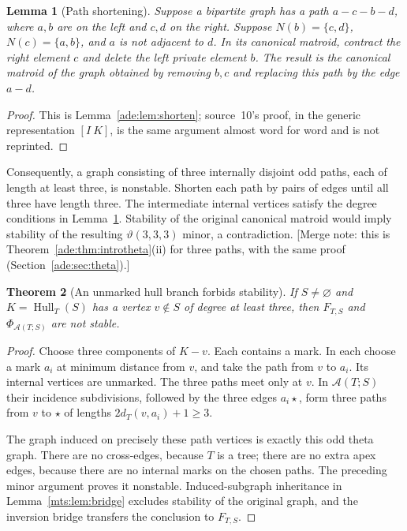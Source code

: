 \documentclass[11pt]{article}
\numberwithin{equation}{section}
\newtheorem{theorem}{Theorem}[section]
\newtheorem{lemma}[theorem]{Lemma}
\theoremstyle{definition}
\newcommand{\calA}{\mathcal A}
\newcommand{\Hull}{\operatorname{Hull}}
\begin{document}
\begin{lemma}[Path shortening]\label{mts:lem:shorten}
Suppose a bipartite graph has a path $a-c-b-d$, where $a,b$ are on the
left and $c,d$ on the right. Suppose $N(b)=\{c,d\}$,
$N(c)=\{a,b\}$, and $a$ is not adjacent to $d$. In its canonical matroid,
contract the right element $c$ and delete the left private element $b$.
The result is the canonical matroid of the graph obtained by removing
$b,c$ and replacing this path by the edge $a-d$.
\end{lemma}
\begin{proof}
This is Lemma~\ref{ade:lem:shorten}; source~10's proof, in the generic
representation $[I\ K]$, is the same argument almost word for word and is
not reprinted.
\end{proof}

Consequently, a graph consisting of three internally disjoint odd paths,
each of length at least three, is nonstable. Shorten each path by pairs of
edges until all three have length three. The intermediate internal vertices
satisfy the degree conditions in Lemma~\ref{mts:lem:shorten}. Stability of the
original canonical matroid would imply stability of the resulting
$\vartheta(3,3,3)$ minor, a contradiction.
[Merge note: this is Theorem~\ref{ade:thm:introtheta}(ii) for three paths,
with the same proof (Section~\ref{ade:sec:theta}).]

\begin{theorem}[An unmarked hull branch forbids stability]\label{mts:thm:branch}
If $S\ne\varnothing$ and $K=\Hull_T(S)$ has a vertex $v\notin S$ of degree
at least three, then $F_{T,S}$ and $\Phi_{\calA(T;S)}$ are not stable.
\end{theorem}
\begin{proof}
Choose three components of $K-v$. Each contains a mark. In each choose a
mark $a_i$ at minimum distance from $v$, and take the path from $v$ to
$a_i$. Its internal vertices are unmarked. The three paths meet only at
$v$. In $\calA(T;S)$ their incidence subdivisions, followed by the three
edges $a_i\star$, form three paths from $v$ to $\star$ of lengths
$2d_T(v,a_i)+1\ge3$.

The graph induced on precisely these path vertices is exactly this odd
theta graph. There are no cross-edges, because $T$ is a tree; there are
no extra apex edges, because there are no internal marks on the chosen
paths. The preceding minor argument proves it nonstable. Induced-subgraph
inheritance in Lemma~\ref{mts:lem:bridge} excludes stability of the original graph,
and the inversion bridge transfers the conclusion to $F_{T,S}$.
\end{proof}
\end{document}
